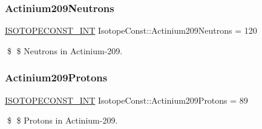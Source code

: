 \subsubsection{\texorpdfstring{Actinium209\+Neutrons}{Actinium209Neutrons}}
{\footnotesize\ttfamily \mbox{\hyperlink{group___isotope_const-_macros_ga5f18360b3e99483a35c32d789e62621c}{I\+S\+O\+T\+O\+P\+E\+C\+O\+N\+S\+T\+\_\+\+I\+NT}} Isotope\+Const\+::\+Actinium209\+Neutrons = 120}

\$ \$ Neutrons in Actinium-\/209. \mbox{\label{group___isotope_const-_actinium-_ac209_ga658730d0fc7c67960dddf769d1a6eb6e}} 
\subsubsection{\texorpdfstring{Actinium209\+Protons}{Actinium209Protons}}
{\footnotesize\ttfamily \mbox{\hyperlink{group___isotope_const-_macros_ga5f18360b3e99483a35c32d789e62621c}{I\+S\+O\+T\+O\+P\+E\+C\+O\+N\+S\+T\+\_\+\+I\+NT}} Isotope\+Const\+::\+Actinium209\+Protons = 89}

\$ \$ Protons in Actinium-\/209. 